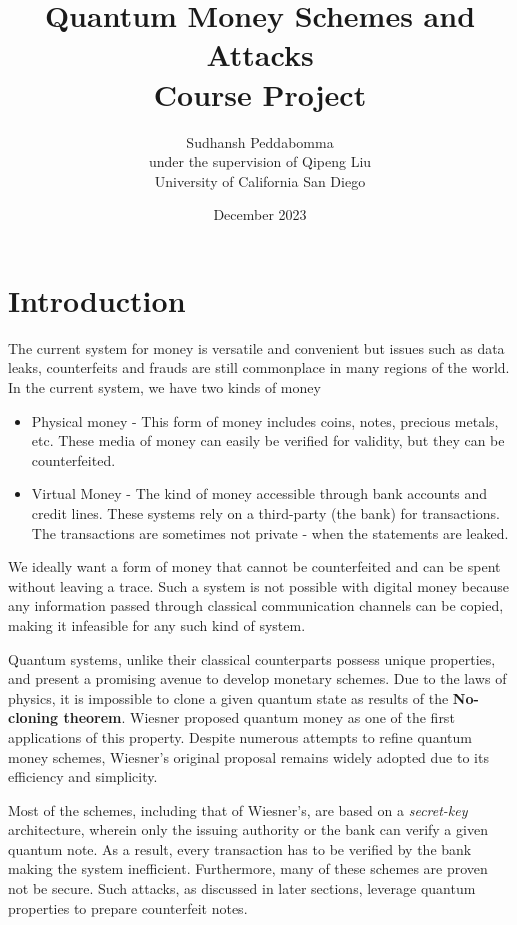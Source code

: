 \documentclass[]{article}
\title{%
    Quantum Money Schemes and Attacks\\ \vspace{10pt}
    \large Course Project \\}
\author{Sudhansh Peddabomma \vspace{5pt} \\  under the supervision of Qipeng Liu \\ University of California San Diego}
\date{December 2023}
\begin{document}
\maketitle
\pagebreak
\tableofcontents
\pagebreak

\section{Introduction}
The current system for money is versatile and convenient but issues such as data leaks, counterfeits and frauds are still commonplace in many regions of the world. In the current system, we have two kinds of money 

\begin{itemize}
    \item Physical money - This form of money includes coins, notes, precious metals, etc. These media of money can easily be verified for validity, but they can be counterfeited.
    \item Virtual Money - The kind of money accessible through bank accounts and credit lines. These systems rely on a third-party (the bank) for transactions. The transactions are sometimes not private - when the statements are leaked.
\end{itemize}

We ideally want a form of money that cannot be counterfeited and can be spent without leaving a trace. Such a system is not possible with digital money because any information passed through classical communication channels can be copied, making it infeasible for any such kind of system.


Quantum systems, unlike their classical counterparts possess unique properties, and present a promising avenue to develop monetary schemes. Due to the laws of physics, it is impossible to clone a given quantum state as results of the \textbf{No-cloning theorem}. Wiesner \cite{Wiesner} proposed quantum money as one of the first applications of this property. Despite numerous attempts to refine quantum money schemes, Wiesner's original proposal remains widely adopted due to its efficiency and simplicity. 


Most of the schemes, including that of Wiesner's, are based on a \textit{secret-key} architecture, wherein only the issuing authority or the bank can verify a given quantum note. As a result, every transaction has to be verified by the bank making the system inefficient. Furthermore, many of these schemes are proven not be secure. Such attacks, as discussed in later sections, leverage quantum properties to prepare counterfeit notes. 
\end{document}
